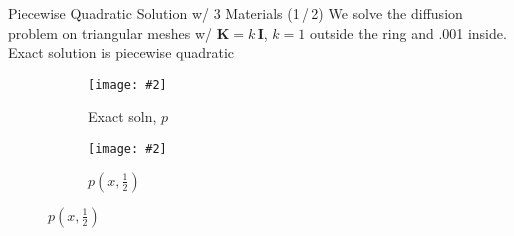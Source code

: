 \documentclass[svgnames]{beamer} %
\newcommand{\includegraphicsw}[2][1.]{\texttt{[image: \#2]}}
\newcommand{\vect}[1]{\boldsymbol{\mathbf{#1}}}
\begin{document}
	\begin{frame}{Piecewise Quadratic Solution w/ 3 Materials (1\,/\,2)}
		We solve the diffusion problem on triangular meshes w/ $\vect K = k\,\vect I$, $k = 1$ outside the ring and .001 inside. Exact solution is piecewise quadratic
		\begin{figure}
			\centering
			\begin{subfigure}{.45\linewidth}
				\centering
				\includegraphicsw{ring_ref_mesh.png}
				\caption{Exact soln, $p$}
			\end{subfigure}%
			\hfill
			\begin{subfigure}{.45\linewidth}
				\centering
				\includegraphicsw{ring_ref_slice.png}
				\caption{$p(x,\frac{1}{2})$}
			\end{subfigure}
		\end{figure}
	\end{frame}
\end{document}
